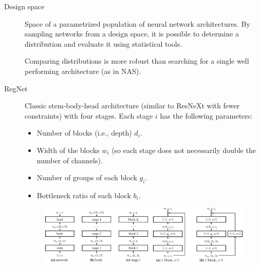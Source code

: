 \begin{description}
    \item[Design space] 
        Space of a parametrized population of neural network architectures. By sampling networks from a design space, it is possible to determine a distribution and evaluate it using statistical tools.

        \begin{remark}
            Comparing distributions is more robust than searching for a single well performing architecture (as in NAS).
        \end{remark}
    
    \item[RegNet] 
        Classic stem-body-head architecture (similar to ResNeXt with fewer constraints) with four stages. Each stage $i$ has the following parameters:
        \begin{itemize}
            \item Number of blocks (i.e., depth) $d_i$.
            \item Width of the blocks $w_i$ (so each stage does not necessarily double the number of channels).
            \item Number of groups of each block $g_i$.
            \item Bottleneck ratio of each block $b_i$.
        \end{itemize}

        \begin{figure}[H]
            \centering
            \includegraphics[width=0.95\linewidth]{./img/regnet.jpg}
        \end{figure}


\end{description}
